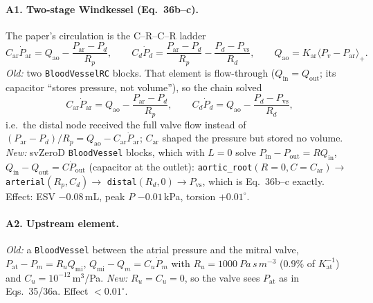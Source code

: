 \documentclass[10pt]{article}
\begin{document}
\paragraph{A1. Two-stage Windkessel (Eq.~36b--c).} The paper's circulation is the
C--R--C--R ladder
\begin{equation*}
C_\text{ar}\dot P_\text{ar} = Q_\text{ao} - \frac{P_\text{ar}-P_d}{R_p},\qquad
C_d\dot P_d = \frac{P_\text{ar}-P_d}{R_p} - \frac{P_d-P_\text{vs}}{R_d},\qquad
Q_\text{ao}=K_\text{ar}\langle P_v-P_\text{ar}\rangle_+ .
\end{equation*}
\emph{Old:} two \texttt{BloodVesselRC} blocks. That element is flow-through
($Q_\text{in}=Q_\text{out}$; its capacitor ``stores pressure, not volume''), so the chain solved
\begin{equation*}
C_\text{ar}\dot P_\text{ar} = Q_\text{ao} - \frac{P_\text{ar}-P_d}{R_p},\qquad
C_d\dot P_d = \boxed{Q_\text{ao}} - \frac{P_d-P_\text{vs}}{R_d},
\end{equation*}
i.e.\ the distal node received the full valve flow instead of
$(P_\text{ar}-P_d)/R_p=Q_\text{ao}-C_\text{ar}\dot P_\text{ar}$; $C_\text{ar}$ shaped the
pressure but stored no volume. \emph{New:} svZeroD \texttt{BloodVessel} blocks, which with
$L=0$ solve $P_\text{in}-P_\text{out}=RQ_\text{in}$, $Q_\text{in}-Q_\text{out}=C\dot P_\text{out}$
(capacitor at the outlet): \texttt{aortic\_root}$(R{=}0,C{=}C_\text{ar})\to$
\texttt{arterial}$(R_p,C_d)\to$ \texttt{distal}$(R_d,0)\to P_\text{vs}$, which is Eq.~36b--c
exactly. Effect: ESV $-0.08$\,mL, peak $P$ $-0.01$\,kPa, torsion $+0.01^\circ$.

\paragraph{A2. Upstream element.} \emph{Old:} a \texttt{BloodVessel} between the atrial pressure
and the mitral valve, $P_\text{at}-P_m=R_uQ_\text{mi}$, $Q_\text{mi}-Q_m=C_u\dot P_m$ with
$R_u=\SI{1000}{Pa\,s\,m^{-3}}$ ($0.9\%$ of $K_\text{at}^{-1}$) and $C_u=10^{-12}$\,m$^3$/Pa.
\emph{New:} $R_u=C_u=0$, so the valve sees $P_\text{at}$ as in Eqs.~35/36a. Effect $<0.01^\circ$.
\end{document}
